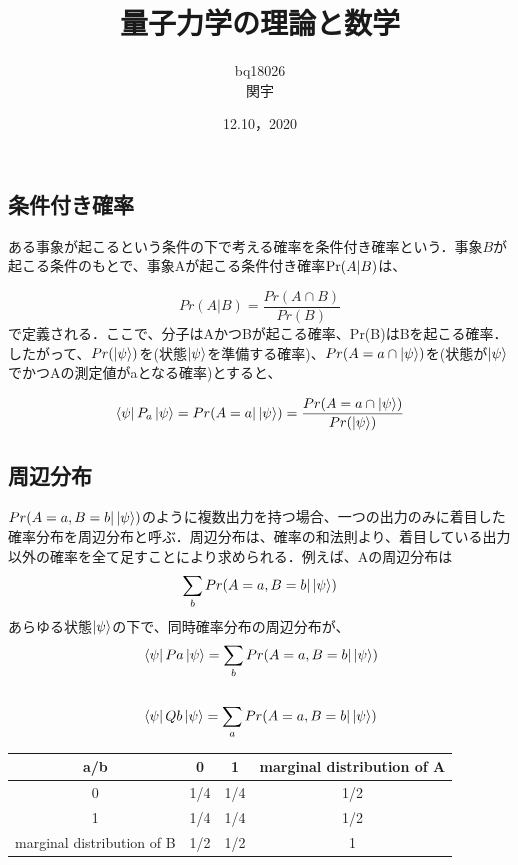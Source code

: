\documentclass[xelatex,ja=standard,jafont=noto]{bxjsarticle}
\title{量子力学の理論と数学}
\author{bq18026\\関宇}
\date{12.10，2020}
\begin{document}
\maketitle

\section{}

\subsection{条件付き確率}

ある事象が起こるという条件の下で考える確率を条件付き確率という．事象$B$が起こる条件のもとで、事象Aが起こる条件付き確率${\rm Pr}(A|B)$は、

\begin{equation}
    Pr(A|B)=\frac{Pr(A\cap B)}{Pr(B)}
\end{equation}
で定義される．ここで、分子はAかつBが起こる確率、Pr(B)はBを起こる確率．したがって、$Pr(\ket{\psi})$を(状態$\ket{\psi}$を準備する確率)、$Pr(A=a\cap\ket{\psi})$を(状態が$\ket{\psi}$でかつAの測定値がaとなる確率)とすると、

\begin{equation}
    \bra{\psi}P_{a}\ket{\psi}=Pr(A=a|\ket{\psi})=\frac{Pr(A=a\cap\ket{\psi})}{Pr(\ket{\psi})}
\end{equation}

\subsection{周辺分布}
$Pr(A=a,B=b|\ket{\psi})$のように複数出力を持つ場合、一つの出力のみに着目した確率分布を周辺分布と呼ぶ．周辺分布は、確率の和法則より、着目している出力以外の確率を全て足すことにより求められる．例えば、Aの周辺分布は
\begin{equation}
    \sum_{b}Pr(A=a,B=b|\ket{\psi})
\end{equation}
あらゆる状態$\ket{\psi}$の下で、同時確率分布の周辺分布が、
\begin{equation}
    \begin{aligned}
        &\bra{\psi}Pa\ket{\psi}=\sum_{b}Pr(A=a,B=b|\ket{\psi})\\
        \\
        &\bra{\psi}Qb\ket{\psi}=\sum_{a}Pr(A=a,B=b|\ket{\psi})
    \end{aligned}
\end{equation}

\begin{center}
\begin{tabular}{ |c|c|c|c| } 
 \hline
 a/b & 0 & 1 & marginal distribution of A\\ 
 \hline
 0 & 1/4 & 1/4 & 1/2\\ 
 \hline
 1 & 1/4 & 1/4 & 1/2\\ 
 \hline
 marginal distribution of B & 1/2 & 1/2 &  1 \\ 
 \hline
\end{tabular}
\end{center}
\end{document}
